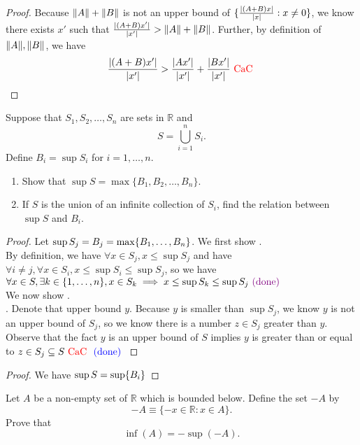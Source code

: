 \documentclass{report}
\begin{document}
\begin{proof}
Because $\| A \|+\| B \|$ is not an upper bound of $\{ \frac{|(A+B)x|}{|x|}:x\neq 0 \}$, we know there exists $x'$ such that  $\frac{|(A+B)x'|}{|x'|}>\| A \|+\| B \|$. Further, by definition of $\| A \|,\| B \|$, we have
\begin{equation}
\frac{|(A+B)x'|}{|x'|}>\frac{|Ax'|}{|x'|}+\frac{|Bx'|}{|x'|}\text{ \textcolor{red}{CaC} }
\end{equation}
\end{proof}

\begin{question}{}{}
Suppose that \(S_1, S_2, \ldots, S_n\) are sets in \(\mathbb{R}\) and 
\[ S = \bigcup_{i=1}^{n} S_i. \]
Define \(B_i = \sup S_i\) for \(i = 1, \ldots, n\).

\begin{enumerate}
    \item Show that \(\sup S = \max\{B_1, B_2, \ldots, B_n\} \).
    \item If \(S\) is the union of an infinite collection of \(S_i\), find the relation between \(\sup S\) and \(B_i\).
\end{enumerate}
\end{question}
\begin{proof}
Let $\sup S_j=B_j=\max \{ B_1,\dots, B_n \}$. We first show .\\

By definition, we have $\forall x\in S_j,x\leq \sup S_j$ and have $\forall i \neq j, \forall x \in S_i, x\leq \sup S_i\leq \sup S_j $, so we have $\forall x\in S, \exists k \in \{ 1,\dots, n \}, x \in S_k \implies x\leq \sup S_k\leq \sup S_j\textcolor{violet}{\text{ (done) }}$\\

We now show  .\\

. Denote that upper bound $y$. Because $y$ is smaller than $\sup S_j$, we know $y$ is not an upper bound of $S_j$, so we know there is a number  $z \in S_j$ greater than $y$. Observe that the fact $y$ is an upper bound of $S$ implies  $y$ is greater than or equal to $z \in S_j\subseteq S\text{ \textcolor{red}{CaC} }\textcolor{blue}{\text{ (done) }}$
\end{proof}
\begin{proof}
We have $\sup S=\sup \{ B_i \}$
\end{proof}
\begin{question}{}{}
Let \( A \) be a non-empty set of \( \mathbb{R} \) which is bounded below. Define the set \( -A \) by 
\[ -A \equiv \{-x \in \mathbb{R} : x \in A\}. \]
Prove that
\[ \inf(A) = -\sup(-A). \]
\end{question}
\end{document}
